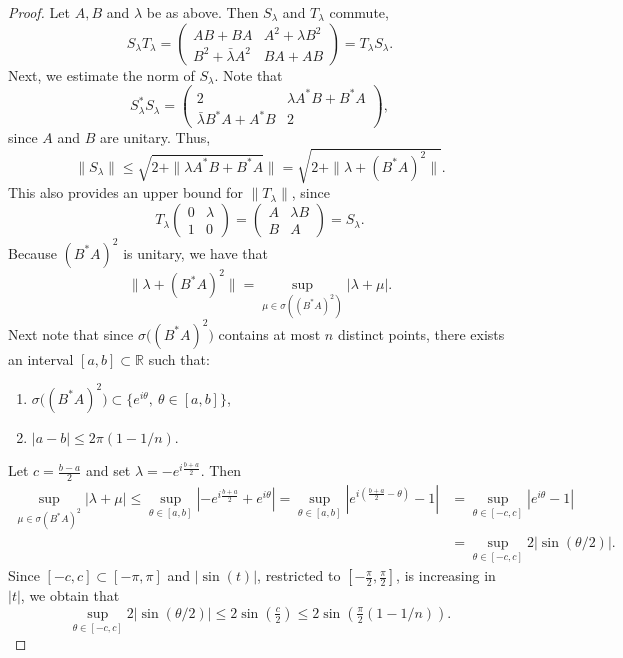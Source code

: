 \begin{proof}
Let $A, B$ and $\lambda$ be as above. Then $S_\lambda$ and $T_\lambda$ commute,
  \[
    S_\lambda T_\lambda=\begin{pmatrix} AB+BA & A^2+\lambda B^2\\ B^2+\bar\lambda A^2 & BA+AB\end{pmatrix}=T_\lambda S_\lambda.
  \]
Next, we estimate the norm of $S_\lambda$. Note that
  \[
    S_\lambda^*S_\lambda=\begin{pmatrix} 2 & \lambda A^*B+B^*A\\ \bar\lambda B^*A+A^*B & 2\end{pmatrix},  
  \]
since $A$ and $B$ are unitary. Thus,
  \[    
    \|S_\lambda\|\le\sqrt{2+\|\lambda A^*B+B^*A}\|=\sqrt{2+\|\lambda+(B^*A)^2\|}.
  \]
This also provides an upper bound for $\|T_\lambda\|$, since
  \[
    T_\lambda\begin{pmatrix} 0 & \lambda\\ 1 & 0\end{pmatrix}=\begin{pmatrix} A & \lambda B\\ B & A\end{pmatrix}=S_\lambda.
  \]
Because $(B^*A)^2$ is unitary, we have that
  \[
    \|\lambda+(B^*A)^2\|=\sup_{\mu\in\sigma((B^*A)^2)}|\lambda+\mu|.
  \]
Next note that since $\sigma\bigl((B^*A)^2\bigr)$ contains at most $n$ distinct points, there exists an interval $[a,b]\subset\mathbb{R}$ such that:
  \begin{enumerate}[label=\roman*)]
    \item $\sigma\bigl((B^*A)^2\bigr)\subset\bigl\{e^{i\theta},\ \theta\in[a,b]\bigr\}$,
    \item $|a-b|\le 2\pi(1-1/n)$.
  \end{enumerate}
Let $c=\tfrac{b-a}{2}$ and set $\lambda=-e^{i\tfrac{b+a}{2}}$. Then
    \begin{align*}
      \sup_{\mu\in\sigma(B^*A)^2}|\lambda+\mu|%
                                                \le\sup_{\theta\in[a,b]}\left|-e^{i\tfrac{b+a}{2}}+e^{i\theta}\right|%
        =\sup_{\theta\in[a,b]}\left|e^{i(\tfrac{b+a}{2}-\theta)}-1\right|%
       &
        =\sup_{\theta\in[-c,c]}|e^{i\theta}-1| \\
       &
        =\sup_{\theta\in[-c,c]}2\bigl|\sin(\theta/2)\bigr|.
    \end{align*}
Since $[-c,c]\subset[-\pi,\pi]$ and $|\sin(t)|$, restricted to $[-\tfrac{\pi}{2},\tfrac{\pi}{2}]$, is increasing in $|t|$, we obtain that 
  \[
    \sup_{\theta\in[-c,c]}2\bigl|\sin(\theta/2)\bigr|\le2\sin(\tfrac{c}{2})\le2\sin\left(\tfrac{\pi}{2}(1-1/n)\right).
  \]
\end{proof}

